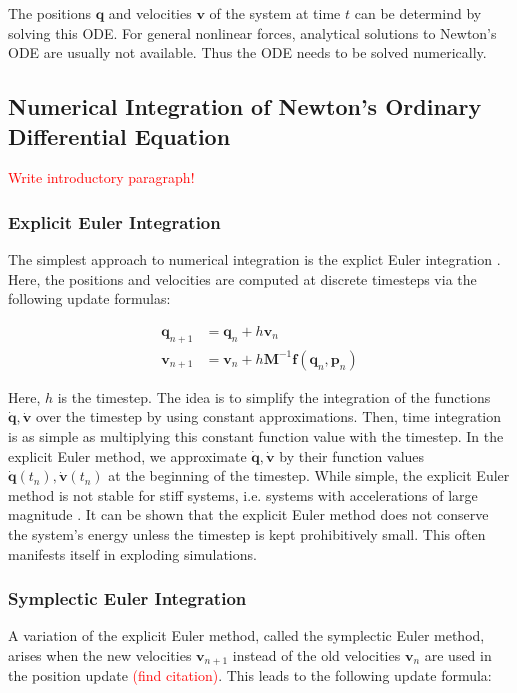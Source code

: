 The positions $\bm{q}$ and velocities $\bm{v}$ of the system at time $t$ can be determind by solving this ODE. For general nonlinear forces,
analytical solutions to Newton's ODE are usually not available. Thus the ODE needs to be solved numerically.

\subsection{Numerical Integration of Newton's Ordinary Differential Equation}\label{s:numerical-integration}
\textcolor{red}{Write introductory paragraph!}

\subsubsection{Explicit Euler Integration}\label{ss:explicit-euler}
The simplest approach to numerical integration is the explict Euler integration \cite{chapra2005}. Here, the positions and velocities 
are computed at discrete timesteps via the following update formulas:

\begin{align*}
    \bm{q}_{n+1} &= \bm{q}_n + h\bm{v}_n\\
    \bm{v}_{n+1} &= \bm{v}_n + h\bm{M}^{-1}\bm{f}(\bm{q}_n, \bm{p}_n)
\end{align*}

\noindent Here, $h$ is the timestep. The idea is to simplify the integration of the functions $\bm{\dot{q}}, \bm{\dot{v}}$ over the timestep by 
using constant approximations. 
Then, time integration is as simple as multiplying this constant function value with the timestep. In the explicit Euler method, we 
approximate $\bm{\dot{q}}, \bm{\dot{v}}$ by their function values $\bm{\dot{q}}(t_n), \bm{\dot{v}}(t_n)$ at the beginning of the timestep.
While simple, the explicit Euler method is not stable for stiff systems, i.e. systems with accelerations of large magnitude 
\cite{chapra2005}. It can be shown that the explicit Euler method does not conserve the system's energy unless the timestep is kept 
prohibitively small. This often manifests itself in exploding simulations.

\subsubsection{Symplectic Euler Integration}\label{ss:symplectic-euler}
A variation of the explicit Euler method, called the symplectic Euler method, arises when the new velocities $\bm{v}_{n+1}$ instead of the
old velocities $\bm{v}_n$ are used in the position update \textcolor{red}{(find citation)}. This leads to the following update formula:

